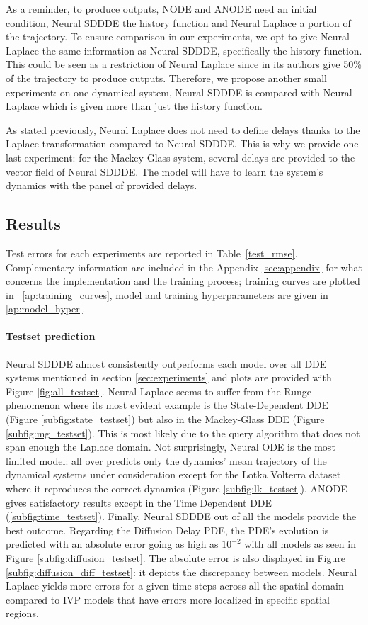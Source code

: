 As a reminder, to produce outputs, NODE and ANODE need an initial condition, Neural SDDDE the history function and Neural Laplace a portion of the trajectory. To ensure comparison in our experiments, we opt to give Neural Laplace the same information as Neural SDDDE, specifically the history function. This could be seen as a restriction of Neural Laplace since in its authors give 50\% of the trajectory to produce outputs. Therefore, we propose another small experiment: on one dynamical system, Neural SDDDE is compared with Neural Laplace which is given more than just the history function. 

As stated previously, Neural Laplace does not need to define delays thanks to the Laplace transformation compared to Neural SDDDE. This is why we provide one last experiment: for the Mackey-Glass system, several delays are provided to the vector field of Neural SDDDE. The model will have to learn the system's dynamics with the panel of provided delays.


\subsection{Results}

Test errors for each experiments are reported in Table~\ref{test_rmse}. Complementary information are included in the Appendix \ref{sec:appendix} for what concerns the implementation and the training process; training curves are plotted in ~\ref{ap:training_curves}, model and training hyperparameters are given in \ref{ap:model_hyper}.

\paragraph{Testset prediction} Neural SDDDE almost consistently outperforms each model over all DDE systems mentioned in section \ref{sec:experiments} and plots are provided with Figure \ref{fig:all_testset}. Neural Laplace seems to suffer from the Runge phenomenon where its most evident example is the State-Dependent DDE (Figure \ref{subfig:state_testset}) but also in the Mackey-Glass DDE (Figure \ref{subfig:mg_testset}). This is most likely due to the query algorithm that does not span enough the Laplace domain. Not surprisingly, Neural ODE is the most limited model: all over predicts only the dynamics' mean trajectory of the dynamical systems under consideration except for the Lotka Volterra dataset where it reproduces the correct dynamics (Figure \ref{subfig:lk_testset}). ANODE gives satisfactory results except in the Time Dependent DDE (\ref{subfig:time_testset}). Finally, Neural SDDDE out of all the models provide the best outcome. Regarding the Diffusion Delay PDE, the PDE's evolution is predicted with an absolute error going as high as $10^{-2}$ with all models as seen in Figure \ref{subfig:diffusion_testset}. The absolute error is also displayed in Figure \ref{subfig:diffusion_diff_testset}: it depicts the discrepancy between models. Neural Laplace yields more errors for a given time steps across all the spatial domain compared to IVP models that have errors more localized in specific spatial regions.

